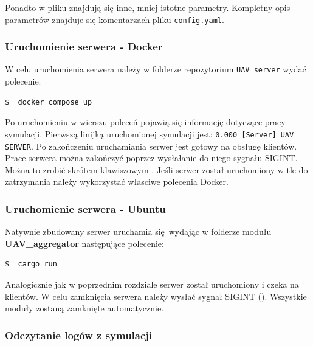 \documentclass[15pt]{sprawozdanie}
\begin{document}
Ponadto w pliku znajdują się inne, mniej istotne parametry. Kompletny opis parametrów znajduje się komentarzach pliku \texttt{config.yaml}.



\subsubsection{Uruchomienie serwera - Docker}

W celu uruchomienia serwera należy w folderze repozytorium \texttt{UAV\_server} wydać polecenie:
\begin{lstlisting}[language=bash]
  $  docker compose up
\end{lstlisting}
Po uruchomieniu w wierszu poleceń pojawią się informację dotyczące pracy symulacji. Pierwszą linijką uruchomionej symulacji jest: \texttt{0.000 [Server] UAV SERVER}. Po zakończeniu uruchamiania serwer jest gotowy na obsługę klientów.\\

Prace serwera można zakończyć poprzez wysłałanie do niego sygnału SIGINT. Można to zrobić skrótem klawiszowym . Jeśli serwer został uruchomiony w tle do zatrzymania należy wykorzystać własciwe polecenia Docker.

\subsubsection{Uruchomienie serwera - Ubuntu}

Natywnie zbudowany serwer uruchamia się wydając w folderze modułu\\ \textbf{UAV\_aggregator} następujące polecenie:
\begin{lstlisting}[language=bash]
  $  cargo run
\end{lstlisting}

Analogicznie jak w poprzednim rozdziale serwer został uruchomiony i czeka na klientów. W celu zamknięcia serwera należy wysłać sygnał SIGINT (). Wszystkie moduły zostaną zamknięte automatycznie.

\subsubsection{Odczytanie logów z symulacji}
\end{document}

